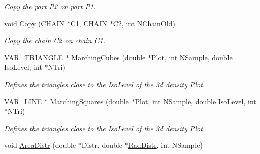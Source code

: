 \begin{DoxyCompactItemize}
\begin{DoxyCompactList}\small\item\em \-Copy the part \-P2 on part \-P1. \end{DoxyCompactList}\item 
\hypertarget{classVarData_a6b4ad600104f81b994be59a1e98be6a6}{void \hyperlink{classVarData_a6b4ad600104f81b994be59a1e98be6a6}{\-Copy} (\hyperlink{structCHAIN}{\-C\-H\-A\-I\-N} $\ast$\-C1, \hyperlink{structCHAIN}{\-C\-H\-A\-I\-N} $\ast$\-C2, int \-N\-Chain\-Old)}\label{classVarData_a6b4ad600104f81b994be59a1e98be6a6}

\begin{DoxyCompactList}\small\item\em \-Copy the chain \-C2 on chain \-C1. \end{DoxyCompactList}\item 
\hypertarget{classVarData_a3bc3dc1509a0daee21e6bdf7e7a39257}{\hyperlink{structVAR__TRIANGLE}{\-V\-A\-R\-\_\-\-T\-R\-I\-A\-N\-G\-L\-E} $\ast$ \hyperlink{classVarData_a3bc3dc1509a0daee21e6bdf7e7a39257}{\-Marching\-Cubes} (double $\ast$\-Plot, int \-N\-Sample, double \-Iso\-Level, int $\ast$\-N\-Tri)}\label{classVarData_a3bc3dc1509a0daee21e6bdf7e7a39257}

\begin{DoxyCompactList}\small\item\em \-Defines the triangles close to the \-Iso\-Level of the 3d density \-Plot. \end{DoxyCompactList}\item 
\hypertarget{classVarData_ae89cde22b05a3a014347e1fd3282b4dc}{\hyperlink{structVAR__LINE}{\-V\-A\-R\-\_\-\-L\-I\-N\-E} $\ast$ \hyperlink{classVarData_ae89cde22b05a3a014347e1fd3282b4dc}{\-Marching\-Squares} (double $\ast$\-Plot, int \-N\-Sample, double \-Iso\-Level, int $\ast$\-N\-Tri)}\label{classVarData_ae89cde22b05a3a014347e1fd3282b4dc}

\begin{DoxyCompactList}\small\item\em \-Defines the triangles close to the \-Iso\-Level of the 3d density \-Plot. \end{DoxyCompactList}\item 
\hypertarget{classVarData_a33ca5c0b94de056eb4425e9c5ce9905c}{void \hyperlink{classVarData_a33ca5c0b94de056eb4425e9c5ce9905c}{\-Area\-Distr} (double $\ast$\-Distr, double $\ast$\hyperlink{classVarData_a4d034e14a193c9943528897b0356ef42}{\-Rad\-Distr}, int \-N\-Sample)}\label{classVarData_a33ca5c0b94de056eb4425e9c5ce9905c}


\end{DoxyCompactItemize}
